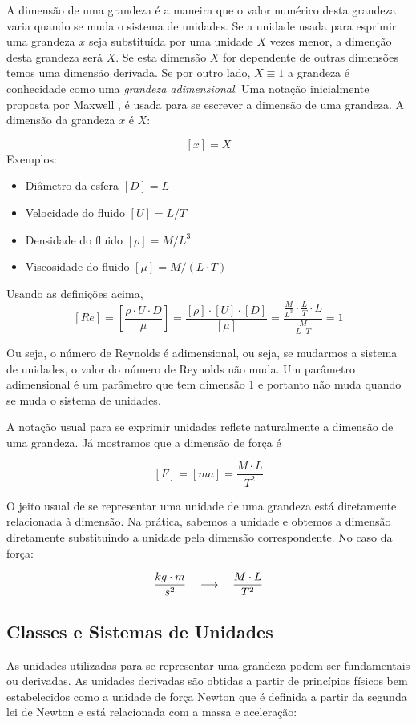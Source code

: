 A dimensão de uma grandeza é a maneira que o valor numérico desta grandeza varia quando se muda o sistema de unidades. Se a unidade usada para esprimir uma grandeza $x$ seja substituída por uma unidade $X$ vezes menor, a dimenção desta grandeza será $X$. Se esta dimensão $X$ for dependente de outras dimensões temos uma dimensão derivada. Se por outro lado, $X\equiv 1$ a grandeza é conhecidade como uma \emph{grandeza adimensional}. Uma notação inicialmente proposta por Maxwell \cite{Maxwell1871}, é usada para se escrever a dimensão de uma grandeza. A dimensão da grandeza $x$ é $X$:

\[
  [x] = X
\]
Exemplos:
\begin{itemize}
\item Diâmetro da esfera $[D] = L$
\item Velocidade do fluido $[U] = L/T$
\item Densidade do fluido $[\rho] = M / L^3$
\item Viscosidade do fluido $[\mu] = M / (L\cdot T)$
\end{itemize}

Usando as definições acima,
\[
  [Re] = \left[ \frac{\rho \cdot U \cdot D}{\mu} \right] = \frac{[\rho]\cdot[U]\cdot [D]}{[\mu]} = \frac{\frac{M}{L^3}\cdot\frac{L}{T}\cdot L}{\frac{M}{L\cdot T}} = 1
\]

Ou seja, o número de Reynolds é adimensional, ou seja, se mudarmos a sistema de unidades, o valor do número de Reynolds não muda. Um parâmetro adimensional é um parâmetro que tem dimensão 1 e portanto não muda quando se muda o sistema de unidades.

A notação usual para se exprimir unidades reflete naturalmente a dimensão de uma grandeza. Já mostramos que a dimensão de força é

\[
  [F] = [ma] = \frac{M\cdot L}{T^2}
\]
  
O jeito usual de se representar uma unidade de uma grandeza está diretamente relacionada à dimensão. Na prática, sabemos a unidade e obtemos a dimensão diretamente substituindo a unidade pela dimensão correspondente. No caso da força:

\[
\frac{kg\cdot m}{s^2} \quad\longrightarrow\quad \frac{M\cdot L}{T^2}
\]
    
  
\subsection{Classes e Sistemas de Unidades}

As unidades utilizadas para se representar uma grandeza podem ser fundamentais ou derivadas. As unidades derivadas são obtidas a partir de princípios físicos bem estabelecidos como a unidade de força Newton que é definida a partir da segunda lei de Newton e está relacionada com a massa e aceleração:

